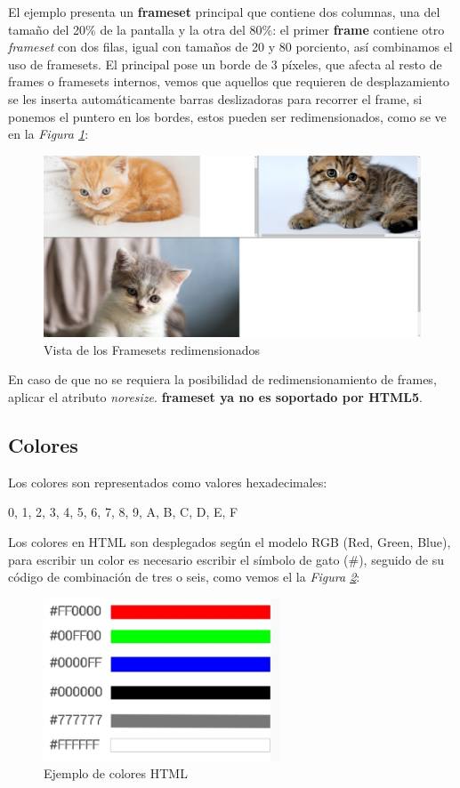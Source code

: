 El ejemplo presenta un \textbf{frameset} principal que contiene dos columnas, una del tamaño del 20\% de la pantalla y la otra del 80\%: el primer \textbf{frame} contiene otro \textit{frameset} con dos filas, igual con tamaños de 20 y 80 porciento, así combinamos el uso de framesets. El principal pose un borde de 3 píxeles, que afecta al resto de frames o framesets internos, vemos que aquellos que requieren de desplazamiento se les inserta automáticamente barras deslizadoras para recorrer el frame, si ponemos el puntero en los bordes, estos pueden ser redimensionados, como se ve en la \textit{Figura \ref{fig: 10}}:
\begin{figure}[H]
    \begin{center}
        \caption{Vista de los Framesets redimensionados}
        \label{fig: 10}
        \includegraphics[width=13cm]{ss_html/frames_2.png}
    \end{center}
\end{figure}

En caso de que no se requiera la posibilidad de redimensionamiento de frames, aplicar el atributo \textit{noresize}. \textbf{frameset ya no es soportado por HTML5}.


\subsection{Colores}

Los colores son representados como valores hexadecimales:
\begin{center}
    0, 1, 2, 3, 4, 5, 6, 7, 8, 9, A, B, C, D, E, F
\end{center}

Los colores en HTML son desplegados según el modelo RGB (Red, Green, Blue), para escribir un color es necesario escribir el símbolo de gato (\#), seguido de su código de combinación de tres o seis, como vemos el la \textit{Figura \ref{fig: 11}}:
\begin{figure}[H]
    \centering
    \caption{Ejemplo de colores HTML}
    \label{fig: 11}
    \includegraphics[width=7cm]{ss_html/ejemplo_colores.png}
\end{figure}
